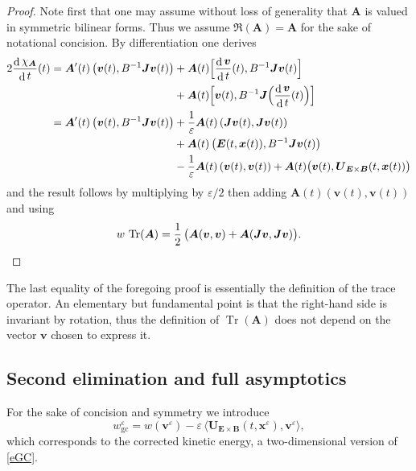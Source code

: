 \documentclass[JEP,XML,SOM,Unicode]{cedram}
\newcommand{\blangle}{\bigl\langle}
\newcommand{\brangle}{\bigr\rangle}
\let\eps\varepsilon
\DeclareMathOperator\dD{d}\let\dd\dD
\DeclareMathOperator{\Tr}{Tr}
\theoremstyle{plain}
\theoremstyle{definition}
\newcommand{\be}{\begin{equation}}
\newcommand{\ee}{\end{equation}}
\newcommand\bA{{\boldsymbol A}}
\newcommand\bB{{\boldsymbol B}}
\newcommand\bE{{\boldsymbol E}}
\newcommand\bJ{{\boldsymbol J}}
\newcommand\bU{{\boldsymbol U}}
\newcommand\bfv{{\boldsymbol v}}
\newcommand\bfx{{\boldsymbol x}}
\let\e w
\newcommand{\eGC}{w_\mathrm{gc}}
\newcommand{\EcB}{\bU_{\bE\times\bB}}
\begin{document}
\begin{proof}
Note first that one may assume without loss of generality that $\bA$ is valued in symmetric bilinear forms. Thus we assume $\Re(\bA)=\bA$ for the sake of notational concision. By differentiation one derives
\begin{align*}
2\frac{\dD\chi_\bA}{\dD t}(t)&=
\bA'(t)\left(\bfv(t),B^{-1}\bJ\bfv(t)\right)
+\bA(t)\Bigl[\frac{\dD\bfv}{\dD t}(t),B^{-1}\bJ\bfv(t)\Bigr]\\
&\hspace*{3.95cm}+\bA(t)\Bigl[\bfv(t),B^{-1}\bJ\Bigl(\frac{\dD\bfv}{\dD
t}(t)\Bigr)\Bigr]
\\
&=
\bA'(t)\left(\bfv(t),B^{-1}\bJ\bfv(t)\right)
+\frac1\eps\bA(t)\left(\bJ\bfv(t),\bJ\bfv(t)\right)\\
&\hspace*{3.95cm}+\bA(t)\left(\bE(t,\bfx(t)),B^{-1}\bJ\bfv(t)\right)
\\
&\hspace*{3.95cm}-\frac1\eps\bA(t)\left(\bfv(t),\bfv(t)\right)
+\bA(t)\bigl(\bfv(t),\EcB(t,\bfx(t))\bigr)
\end{align*}
and the result follows by multiplying by $\eps/2$ then adding $\bA(t)(\bfv(t),\bfv(t))$ and using
\[
\e\,\Tr(\bA)
=\frac12\,\bigl(\bA(\bfv,\bfv)
+\bA(\bJ\bfv,\bJ\bfv)\bigr).\qedhere
\]
\end{proof}

The last equality of the foregoing proof is essentially the definition of the trace operator. An elementary but fundamental point is that the right-hand side is invariant by rotation, thus the definition of $\Tr(\bA)$ does not depend on the vector $\bfv$ chosen to express it.

\subsection{Second elimination and full asymptotics}\label{s:hom-full}
For the sake of concision and symmetry we introduce
\be
\label{toy-egc}
\eGC^\eps=
\e(\bfv^\eps)-\eps\,\blangle\EcB(t,\bfx^\eps),\bfv^\eps\brangle,
\ee
which corresponds to the corrected kinetic energy, a two-dimensional version of \eqref{eGC}.
\end{document}
